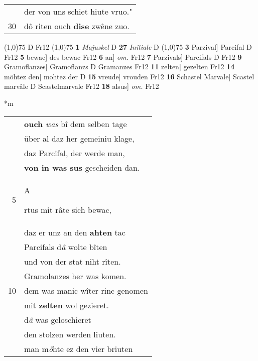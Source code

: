 \documentclass[8pt,a4paper,notitlepage]{article}
\begin{document}
\begin{table}[ht]
\begin{minipage}[t]{0.5\linewidth}
\begin{tabular}{rl}
 & der von uns schiet hiute vruo."\\ 
30 & dô riten ouch \textbf{dise} zwêne zuo.\\ 
\end{tabular}
\scriptsize
\line(1,0){75} \newline
D Fr12 \newline
\line(1,0){75} \newline
\textbf{1} \textit{Majuskel} D  \textbf{27} \textit{Initiale} D  \newline
\line(1,0){75} \newline
\textbf{3} Parzival] Parcifal D Fr12 \textbf{5} bewac] des bewac Fr12 \textbf{6} an] \textit{om.} Fr12 \textbf{7} Parzivals] Parcifals D Fr12 \textbf{9} Gramoflanzes] Gramoflanzs D Gramanzes Fr12 \textbf{11} zelten] gezelten Fr12 \textbf{14} möhtez den] mohtez der D \textbf{15} vreude] vrouden Fr12 \textbf{16} Schastel Marvale] Scastel marvâle D Scastelmarvale Fr12 \textbf{18} alsus] \textit{om.} Fr12 \newline
\end{minipage}
\hspace{0.5cm}
\begin{minipage}[t]{0.5\linewidth}
\small
\begin{center}*m
\end{center}
\begin{tabular}{rl}
 & \textbf{ouch} \textit{was} bî dem selben tage\\ 
 & über al daz her gemeiniu klage,\\ 
 & daz Parcifal, der werde man,\\ 
 & \textbf{von in was sus} gescheiden dan.\\ 
5 & \begin{large}A\end{large}rtus mit râte sich bewac,\\ 
 & daz er unz an den \textbf{ahten} tac\\ 
 & Parcifals d\textit{â} wolte bîten\\ 
 & und von der stat niht rîten.\\ 
 & Gramolanzes her was komen.\\ 
10 & dem was manic wîter rinc genomen\\ 
 & mit \textbf{zelten} wol gezieret.\\ 
 & d\textit{â} was geloschieret\\ 
 & den stolzen werden liuten.\\ 
 & man m\textit{ö}hte ez den vier briuten\\ 

\end{tabular}
\end{minipage}
\end{table}
\end{document}
